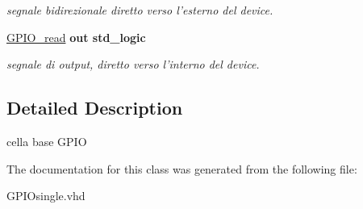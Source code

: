 \begin{DoxyCompactItemize}
\begin{DoxyCompactList}\small\item\em segnale bidirezionale diretto verso l'esterno del device. \end{DoxyCompactList}\item 
\hypertarget{class_g_p_i_osingle_ga4a6632a5d5cd6c4e6c1b634286795362}{\hyperlink{group__my_g_p_i_o_ga4a6632a5d5cd6c4e6c1b634286795362}{G\+P\+I\+O\+\_\+read}  {\bfseries {\bfseries \textcolor{vhdlchar}{out}\textcolor{vhdlchar}{ }}} {\bfseries \textcolor{vhdlchar}{std\+\_\+logic}\textcolor{vhdlchar}{ }} }\label{class_g_p_i_osingle_ga4a6632a5d5cd6c4e6c1b634286795362}

\begin{DoxyCompactList}\small\item\em segnale di output, diretto verso l'interno del device. \end{DoxyCompactList}\end{DoxyCompactItemize}


\subsection{Detailed Description}
cella base G\+P\+I\+O 

The documentation for this class was generated from the following file\+:\begin{DoxyCompactItemize}
\item 
G\+P\+I\+Osingle.\+vhd\end{DoxyCompactItemize}
